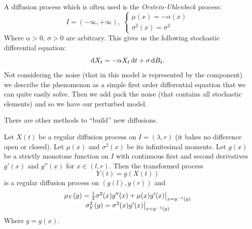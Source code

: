 \documentclass[12pt]{report}
\begin{document}
A diffusion process which is often used is the \emph{Orstein-Uhlenbeck} process:
\begin{equation*}
	I=(-\infty,+\infty),\;\begin{cases}
		\mu(x)=-\alpha(x)\\
		\sigma^{2}(x)=\sigma^{2}
	\end{cases}
\end{equation*}
Where $\alpha>0$, $\sigma>0$ are arbitrary. This gives us the following stochastic differential equation:
\begin{equation*}
	\mathop{}\!\mathrm{d} X_{t}=-\alpha X_{t}\mathop{}\!\mathrm{d} t+\sigma\mathop{}\!\mathrm{d} B_{t}.
\end{equation*}
Not considering the noise (that in this model is represented by the \bwm{} component) we describe the phenomenon as a simple first order differential equation that we can quite easily solve. Then we add pack the noise (that contains all stochastic elements) and so we have our perturbed model.\par
There are other methods to ``build'' new diffusions.
\begin{theorem}
	Let $X(t)$ be a regular diffusion process on $I=(\lambda,r)$ (it bakes no difference open or closed). Let $\mu(x)$ and $\sigma^{2}(x)$ be its infinitesimal moments. Let $g(x)$ be a strictly monotone function on $I$ with continuous first and second derivatives $g'(x)$ and $g''(x)$ for $x\in(l,r)$. Then the transformed process
	\begin{equation*}
		Y(t)=g(X(t))
	\end{equation*}
	is a regular diffusion process on $(g(l),g(r))$ and
	\begin{equation*}
		\begin{array}{c}
			\mu_{Y}(y)=\frac{1}{2}\sigma^{2}(x)g''(x)+\mu(x)g'(x)\big|_{x=g^{-1}(y)}\\
			\sigma^{2}_{Y}(y)=\sigma^{2}(x)g'(x)\big|_{x=g^{-1}(g)}
		\end{array}
	\end{equation*}
	Where $y=g(x)$.
\end{theorem}
\end{document}
